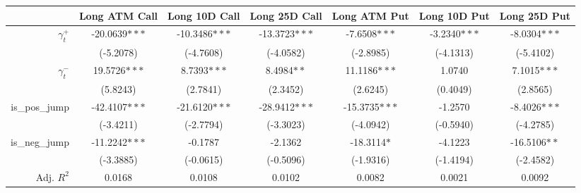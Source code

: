 \begin{tabular}{rSSSSSS}
\toprule
{} &  {Long ATM Call} &  {Long 10D Call} &  {Long 25D Call} &   {Long ATM Put} &  {Long 10D Put} &  {Long 25D Put} \\
\midrule
$\gamma^+_t$         &  -20.0639$***$ &  -10.3486$***$ &  -13.3723$***$ &   -7.6508$***$ &  -3.2340$***$ &  -8.0304$***$ \\
            &      (-5.2078) &      (-4.7608) &      (-4.0582) &      (-2.8985) &     (-4.1313) &     (-5.4102) \\
$\gamma^-_t$         &   19.5726$***$ &    8.7393$***$ &     8.4984$**$ &   11.1186$***$ &        1.0740 &   7.1015$***$ \\
            &       (5.8243) &       (2.7841) &       (2.3452) &       (2.6245) &      (0.4049) &      (2.8565) \\
is\_pos\_jump &  -42.4107$***$ &  -21.6120$***$ &  -28.9412$***$ &  -15.3735$***$ &       -1.2570 &  -8.4026$***$ \\
            &      (-3.4211) &      (-2.7794) &      (-3.3023) &      (-4.0942) &     (-0.5940) &     (-4.2785) \\
is\_neg\_jump &  -11.2242$***$ &        -0.1787 &        -2.1362 &    -18.3114$*$ &       -4.1223 &  -16.5106$**$ \\
            &      (-3.3885) &      (-0.0615) &      (-0.5096) &      (-1.9316) &     (-1.4194) &     (-2.4582) \\
\midrule
Adj. $R^2$ & 0.0168 & 0.0108 & 0.0102 & 0.0082 & 0.0021 & 0.0092\\\bottomrule
\end{tabular}
